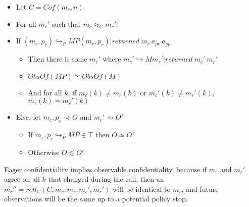 \documentclass{article}
\begin{document}
      \begin{itemize}
        \item Let \(C = \mathit{Cof}(m_c,n)\)
        \item For all \(m_c'\) such that \(m_c \approx_C m_c'\):
        \item If \((m_c,p_c) \hookrightarrow_P MP (m_r,p_r) | \mathit{returned}\ m_r\ a_{pc}\ a_{sp}\)
          \begin{itemize}
            \item Then there is some \(m_r'\) where
              \(m_c' \hookrightarrow M m_r' | \mathit{returned}\ m_c'\ m_r'\)
            \item \(\mathit{ObsOf}(MP) \simeq \mathit{ObsOf}(M)\)
            \item And for all \(k\), if \(m_c(k) \not = m_r(k)\) or \(m_c'(k) \not = m_r'(k)\),
              \(m_r(k) = m_r'(k)\)
          \end{itemize}
        \item Else, let \(m_c,p_c \rightsquigarrow O\) and \(m_c' \rightsquigarrow O'\)
          \begin{itemize}
            \item If \(m_c,p_c \hookrightarrow_P MP \in \top\) then \(O \simeq O'\)
            \item Otherwise \(O \lesssim O'\)
          \end{itemize}
      \end{itemize}

      Eager confidentiality implies observable confidentiality, because if \(m_r\) and \(m_r'\) agree
      on all \(k\) that changed during the call, then an \(m_r'' = \mathit{roll}_C(C,m_c,m_r,m_c',m_r')\)
      will be identical to \(m_r\), and future observations will be the same up to a potential policy
      stop.
 
\end{document}
